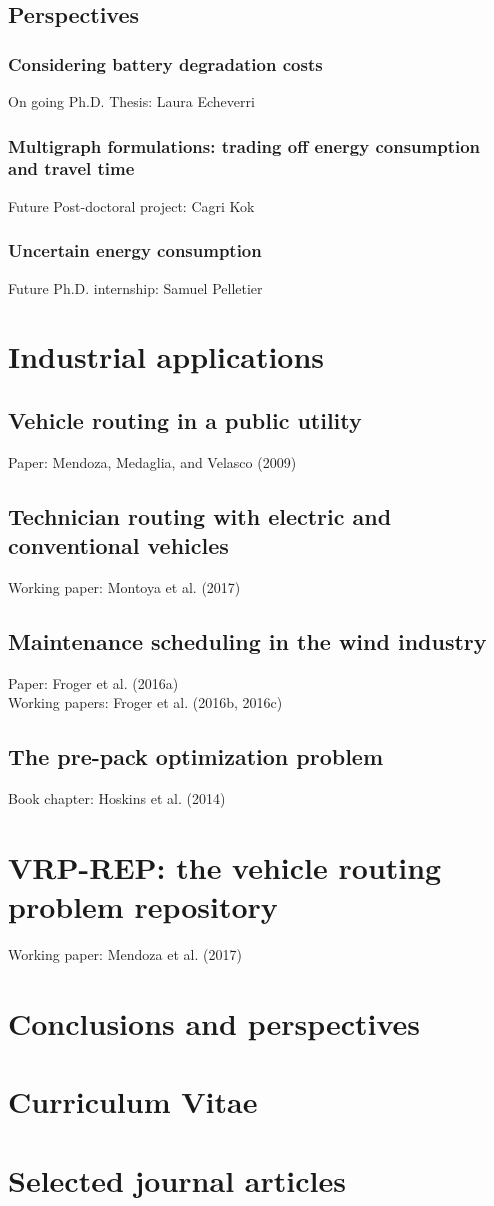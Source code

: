 \documentclass[10pt,a4paper]{book}
\begin{document}
  \section{Perspectives}
  \subsection{Considering battery degradation costs}
  	On going Ph.D. Thesis: Laura Echeverri
  \subsection{Multigraph formulations: trading off energy consumption and travel time}
  	Future Post-doctoral project: Cagri Kok
  \subsection{Uncertain energy consumption}
  	Future Ph.D. internship: Samuel Pelletier

\chapter{Industrial applications}
  \section{Vehicle routing in a public utility}
  Paper: Mendoza, Medaglia, and Velasco (2009)
  \section{Technician routing with electric and conventional vehicles}
  Working paper: Montoya et al. (2017)
  \section{Maintenance scheduling in the wind industry}
  Paper: Froger et al. (2016a)\\
  Working papers: Froger et al. (2016b, 2016c)
  \section{The pre-pack optimization problem}
  Book chapter: Hoskins et al. (2014)
\chapter{VRP-REP: the vehicle routing problem repository}
Working paper: Mendoza et al. (2017)

\chapter{Conclusions and perspectives}

\begin{appendix}
\chapter{Curriculum Vitae}
\chapter{Selected journal articles}
\end{appendix}
\end{document}
